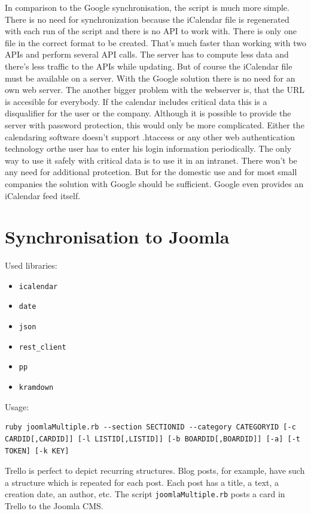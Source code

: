 In comparison to the Google synchronisation, the script is much more simple. There is no need for synchronization because the iCalendar file is regenerated with each run of the script and there is no API to work with. There is only one file in the correct format to be created. That's much faster than working with two APIs and perform several API calls. The server has to compute less data and there's less traffic to the APIs while updating. But of course the iCalendar file must be available on a server. With the Google solution there is no need for an own web server. The another bigger problem with the webserver is, that the URL is accesible for everybody. If the calendar includes critical data this is a disqualifier for the user or the company. Although it is possible to provide the server with password protection, this would only be more complicated. Either the calendaring software doesn't support .htaccess or any other web authentication technology orthe user has to enter his login information periodically. The only way to use it safely with critical data is to use it in an intranet. There won't be any need for additional protcetion. But for the domestic use and for most small companies the solution with Google  should be sufficient. Google even provides an iCalendar feed itself. 

\section{Synchronisation to Joomla}

Used libraries:
\begin{itemize}
	\item \texttt{icalendar}
	\item \texttt{date}
	\item \texttt{json}
	\item \texttt{rest\_client}
	\item \texttt{pp}
	\item \texttt{kramdown}
\end{itemize}

Usage:
\begin{lstlisting}[aboveskip=1\baselineskip, style=bash, caption=\texttt{joomlaMultiple.rb} usage., label=listing028]
ruby joomlaMultiple.rb --section SECTIONID --category CATEGORYID [-c CARDID[,CARDID]] [-l LISTID[,LISTID]] [-b BOARDID[,BOARDID]] [-a] [-t TOKEN] [-k KEY]
\end{lstlisting}

Trello is perfect to depict recurring structures. Blog posts, for example, have such a structure which is repeated for each post. Each post has a title, a text, a creation date, an author, etc. The script \texttt{joomlaMultiple.rb} posts a card in Trello to the Joomla CMS.

